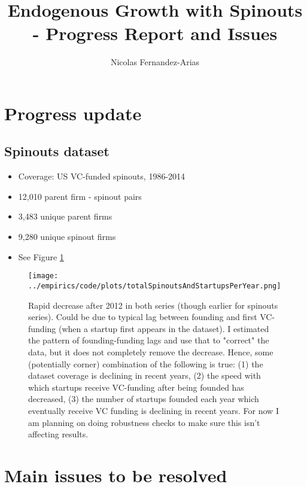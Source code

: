 \documentclass[12pt,english]{article}
\theoremstyle{remark}
\begin{document}
	
	
	
\title{Endogenous Growth with Spinouts - Progress Report and Issues}
\author{Nicolas Fernandez-Arias}
\maketitle

\section{Progress update}

\subsection{Spinouts dataset}

\begin{itemize}
	\item Coverage: US VC-funded spinouts, 1986-2014
	\item 12,010 parent firm - spinout pairs
	\item 3,483 unique parent firms
	\item 9,280 unique spinout firms
	\item See Figure \ref{TotalSpinoutCount}
\end{itemize}

\begin{figure}[h]  
	\centering
	\texttt{[image: ../empirics/code/plots/totalSpinoutsAndStartupsPerYear.png]}
	\caption{Rapid decrease after 2012 in both series (though earlier for spinouts series). Could be due to typical lag between founding and first VC-funding (when a startup first appears in the dataset). I estimated the pattern of founding-funding lags and use that to "correct" the data, but it does not completely remove the decrease. Hence, some (potentially corner) combination of the following is true: (1) the dataset coverage is declining in recent years, (2) the speed with which startups receive VC-funding after being founded has decreased, (3) the number of startups founded each year which eventually receive VC funding is declining in recent years. For now I am planning on doing robustness checks to make sure this isn't affecting results.}
	\label{TotalSpinoutCount}
\end{figure}


\section{Main issues to be resolved}
\end{document}
